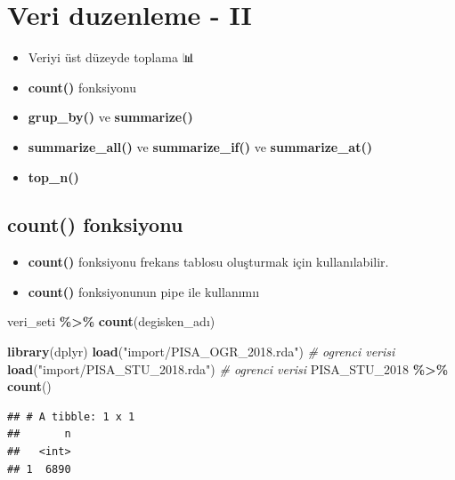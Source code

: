 \documentclass[
  oneside]{book}
\newenvironment{Shaded}{\begin{snugshade}}{\end{snugshade}}
\newcommand{\CommentTok}[1]{\textcolor[rgb]{0.56,0.35,0.01}{\textit{#1}}}
\newcommand{\FunctionTok}[1]{\textcolor[rgb]{0.13,0.29,0.53}{\textbf{#1}}}
\newcommand{\NormalTok}[1]{#1}
\newcommand{\SpecialCharTok}[1]{\textcolor[rgb]{0.81,0.36,0.00}{\textbf{#1}}}
\newcommand{\StringTok}[1]{\textcolor[rgb]{0.31,0.60,0.02}{#1}}
\begin{document}
\hypertarget{veri-duzenleme---ii}{%
\chapter{Veri duzenleme - II}\label{veri-duzenleme---ii}}

\begin{itemize}
\item
  Veriyi üst düzeyde toplama 📊
\item
  \textbf{count()} fonksiyonu
\item
  \textbf{grup\_by()} ve \textbf{summarize()}
\item
  \textbf{summarize\_all()} ve \textbf{summarize\_if()} ve \textbf{summarize\_at()}
\item
  \textbf{top\_n()}
\end{itemize}

\hypertarget{count-fonksiyonu}{%
\section{count() fonksiyonu}\label{count-fonksiyonu}}

\begin{itemize}
\item
  \textbf{count()} fonksiyonu frekans tablosu oluşturmak için kullanılabilir.
\item
  \textbf{count()} fonksiyonunun pipe ile kullanımıı
\end{itemize}

\begin{Shaded}
\begin{Highlighting}[]
\NormalTok{veri\_seti }\SpecialCharTok{\%\textgreater{}\%} \FunctionTok{count}\NormalTok{(degisken\_adı)}
\end{Highlighting}
\end{Shaded}

\begin{Shaded}
\begin{Highlighting}[]
\FunctionTok{library}\NormalTok{(dplyr)}
\FunctionTok{load}\NormalTok{(}\StringTok{"import/PISA\_OGR\_2018.rda"}\NormalTok{) }\CommentTok{\# ogrenci verisi}
\FunctionTok{load}\NormalTok{(}\StringTok{"import/PISA\_STU\_2018.rda"}\NormalTok{) }\CommentTok{\# ogrenci verisi}
\NormalTok{PISA\_STU\_2018 }\SpecialCharTok{\%\textgreater{}\%} \FunctionTok{count}\NormalTok{()}
\end{Highlighting}
\end{Shaded}

\begin{verbatim}
## # A tibble: 1 x 1
##       n
##   <int>
## 1  6890
\end{verbatim}
\end{document}
